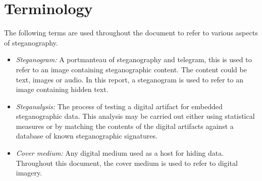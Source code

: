 \section{Terminology}
The following terms are used throughout the document to refer to various aspects of steganography. 
\begin{itemize}
\item{\emph{Steganogram:}} A portmanteau of steganography and telegram, this is used to refer to an image containing steganographic content. The content could be text, images or audio. In this report, a steganogram is used to refer to an image containing hidden text.
\item{\emph{Steganalysis:}} The process of testing a digital artifact for embedded steganographic data. This analysis may be carried out either using statistical measures or by matching the contents of the digital artifacts against a database of known steganographic signatures.
\item{\emph{Cover medium:}} Any digital medium used as a host for hiding data. Throughout this document, the cover medium is used to refer to digital imagery.
\end{itemize}
